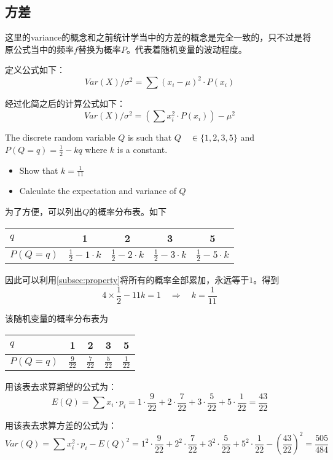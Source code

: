 \subsection*{方差}
这里的\gls{variance}的概念和之前统计学当中的方差的概念是完全一致的，只不过是将原公式当中的频率$f$替换为概率$P$。代表着随机变量的波动程度。

定义公式如下：
\[
	Var(X)/\sigma^2 = \sum (x_i-\mu)^2\cdot P(x_i)
\]

经过化简之后的计算公式如下：
\[
	Var(X)/\sigma^2 = \left(\sum x_i^2\cdot P(x_i)\right)-\mu^2
\]


\begin{ExampleBox}
The discrete random variable $Q$ is such that $Q\quad \in \{1,2,3,5\}$ and $P(Q=q)=\frac{1}{2}-kq$ where $k$ is a constant.
\begin{itemize}
\item
Show that $k=\frac{1}{11}$
\item
Calculate the expectation and variance of $Q$
\end{itemize}

\tcblower
为了方便，可以列出$Q$的概率分布表。如下
\begin{table}[H]
\centering
\begin{tabular}{|l|c|c|c|c|}
\hline
$q$      & 1                      & 2                      & 3                      & 5                      \\ \hline
$P(Q=q)$ & $\frac{1}{2}-1\cdot k$ & $\frac{1}{2}-2\cdot k$ & $\frac{1}{2}-3\cdot k$ & $\frac{1}{2}-5\cdot k$ \\ \hline
\end{tabular}
\end{table}

因此可以利用\ref{subsec:property}将所有的概率全部累加，永远等于$1$。得到
\[
4\times \frac{1}{2} - 11k = 1 \quad \Longrightarrow  \quad k =\frac{1}{11}
\]

该随机变量的概率分布表为
\begin{table}[H]
\centering
\begin{tabular}{|l|c|c|c|c|}
\hline
$q$      & 1                      & 2                      & 3                      & 5                      \\ \hline
$P(Q=q)$ & $\frac{9}{22}$ & $\frac{7}{22}$ & $\frac{5}{22}$ & $\frac{1}{22}$ \\ \hline
\end{tabular}
\end{table}
用该表去求算期望的公式为：
\[
	E(Q)= \sum x_i\cdot p_i =1\cdot \frac{9}{22}+2\cdot \frac{7}{22}+3\cdot \frac{5}{22}+5\cdot \frac{1}{22} = \frac{43}{22}
\]

用该表去求算方差的公式为：
\[
	Var(Q)=\sum x_i^2\cdot p_i-E(Q)^2=1^2\cdot \frac{9}{22}+2^2\cdot \frac{7}{22}+3^2\cdot \frac{5}{22}+5^2\cdot \frac{1}{22}-(\frac{43}{22})^2 =\frac{505}{484}
\]
\end{ExampleBox}


